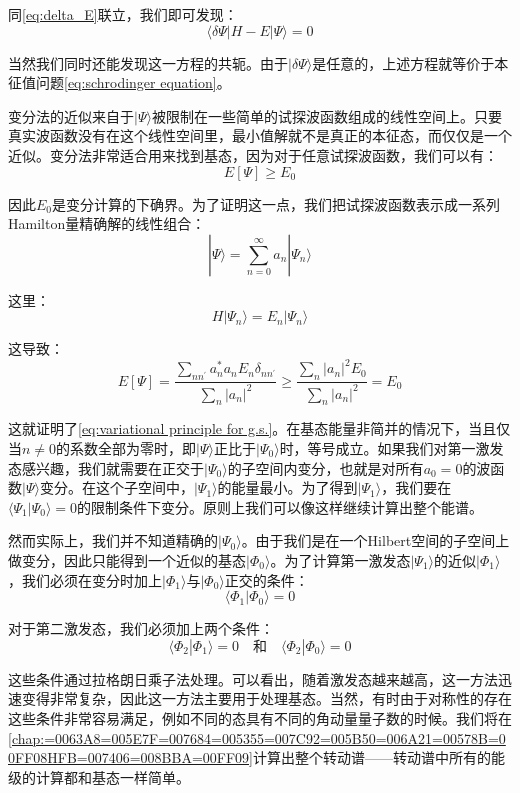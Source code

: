 同\ref{eq:delta_E}联立，我们即可发现：
\[
\langle\delta\Psi|H-E|\Psi\rangle=0
\]

当然我们同时还能发现这一方程的共轭。由于$|\delta\Psi\rangle$是任意的，上述方程就等价于本征值问题\ref{eq:schrodinger equation}。

变分法的近似来自于$|\Psi\rangle$被限制在一些简单的试探波函数组成的线性空间上。只要真实波函数没有在这个线性空间里，最小值解就不是真正的本征态，而仅仅是一个近似。变分法非常适合用来找到基态，因为对于任意试探波函数，我们可以有：
\begin{equation}
E[\Psi]\geq E_{0}\label{eq:variational principle for g.s.}
\end{equation}

因此$E_{0}$是变分计算的下确界。为了证明这一点，我们把试探波函数表示成一系列Hamilton量精确解的线性组合：
\[
|\Psi\rangle=\sum^{\infty}_{n=0}a_{n}|\Psi_{n}\rangle
\]

这里：
\[
H|\Psi_{n}\rangle=E_{n}|\Psi_{n}\rangle
\]

这导致：
\[
E[\Psi]=\frac{\sum_{nn^{\prime}}a^{*}_{n}a_{n}E_{n}\delta_{nn^{\prime}}}{\sum_{n}|a_{n}|^{2}}\geq\frac{\sum_{n}|a_{n}|^{2}E_{0}}{\sum_{n}|a_{n}|^{2}}=E_{0}
\]

这就证明了\ref{eq:variational principle for g.s.}。在基态能量非简并的情况下，当且仅当$n\neq0$的系数全部为零时，即$|\Psi\rangle$正比于$|\Psi_{0}\rangle$时，等号成立。如果我们对第一激发态感兴趣，我们就需要在正交于$|\Psi_{0}\rangle$的子空间内变分，也就是对所有$a_{0}=0$的波函数$|\Psi\rangle$变分。在这个子空间中，$|\Psi_{1}\rangle$的能量最小。为了得到$|\Psi_{1}\rangle$，我们要在$\langle\Psi_{1}|\Psi_{0}\rangle=0$的限制条件下变分。原则上我们可以像这样继续计算出整个能谱。

然而实际上，我们并不知道精确的$|\Psi_{0}\rangle$。由于我们是在一个Hilbert空间的子空间上做变分，因此只能得到一个近似的基态$|\Phi_{0}\rangle$。为了计算第一激发态$|\Psi_{1}\rangle$的近似$|\Phi_{1}\rangle$，我们必须在变分时加上$|\Phi_{1}\rangle$与$|\Phi_{0}\rangle$正交的条件：
\[
\langle\Phi_{1}|\Phi_{0}\rangle=0
\]

对于第二激发态，我们必须加上两个条件：
\[
\langle\Phi_{2}|\Phi_{1}\rangle=0\quad\text{和}\quad\langle\Phi_{2}|\Phi_{0}\rangle=0
\]

这些条件通过拉格朗日乘子法处理。可以看出，随着激发态越来越高，这一方法迅速变得非常复杂，因此这一方法主要用于处理基态。当然，有时由于对称性的存在这些条件非常容易满足，例如不同的态具有不同的角动量量子数的时候。我们将在\ref{chap:=0063A8=005E7F=007684=005355=007C92=005B50=006A21=00578B=00FF08HFB=007406=008BBA=00FF09}计算出整个转动谱——转动谱中所有的能级的计算都和基态一样简单。

